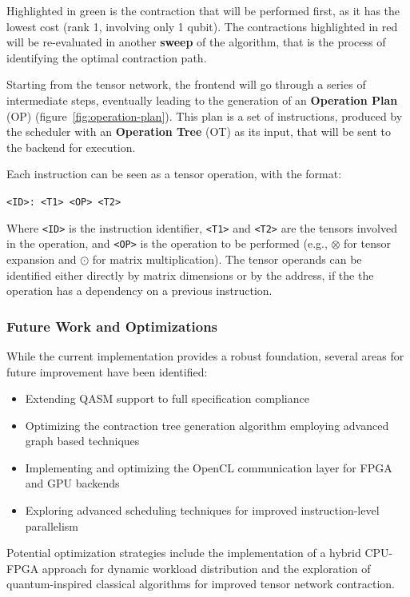 \documentclass[12pt,oneside,a4paper]{article}
\begin{document}
Highlighted in green is the contraction that will be performed first, as it has the lowest cost (rank 1, involving only 1 qubit). The contractions highlighted in red will be re-evaluated in another \textbf{sweep} of the algorithm, that is the process of identifying the optimal contraction path.

Starting from the tensor network, the frontend will go through a series of intermediate steps, eventually leading to the generation of an \textbf{Operation Plan} (OP) (figure~\ref{fig:operation-plan}). This plan is a set of instructions, produced by the scheduler with an \textbf{Operation Tree} (OT) as its input, that will be sent to the backend for execution.

Each instruction can be seen as a tensor operation, with the format:

\begin{center}
    \texttt{<ID>: <T1> <OP> <T2>}
\end{center}

Where \texttt{<ID>} is the instruction identifier, \texttt{<T1>} and \texttt{<T2>} are the tensors involved in the operation, and \texttt{<OP>} is the operation to be performed (e.g., $\otimes$ for tensor expansion and $\odot$ for matrix multiplication). The tensor operands can be identified either directly by matrix dimensions or by the address, if the the operation has a dependency on a previous instruction.

\subsubsection{Future Work and Optimizations}

While the current implementation provides a robust foundation, several areas for future improvement have been identified:

\begin{itemize}
    \item Extending QASM support to full specification compliance
    \item Optimizing the contraction tree generation algorithm employing advanced graph based techniques \cite{PhysRevE.90.033315}
    \item Implementing and optimizing the OpenCL communication layer for FPGA and GPU backends
    \item Exploring advanced scheduling techniques for improved instruction-level parallelism
\end{itemize}

Potential optimization strategies include the implementation of a hybrid CPU-FPGA approach for dynamic workload distribution and the exploration of quantum-inspired classical algorithms for improved tensor network contraction.
\end{document}
